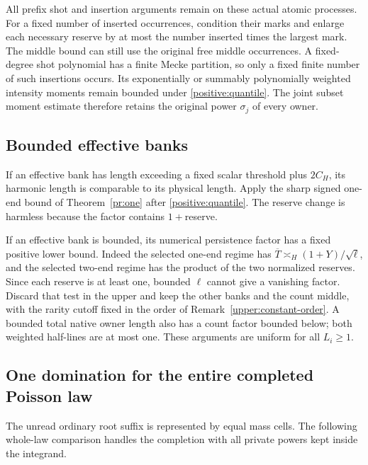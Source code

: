 All prefix shot and insertion arguments remain on these actual atomic
processes. For a fixed number of inserted occurrences, condition their
marks and enlarge each necessary reserve by at most the number inserted
times the largest mark. The middle bound can still use the original
free middle occurrences. A fixed-degree shot polynomial has a finite
Mecke partition, so only a fixed finite number of such insertions occurs.
Its exponentially or summably polynomially weighted intensity moments
remain bounded under \eqref{positive:quantile}. The joint subset moment
estimate therefore retains the original power $\sigma_j$ of every owner.

\subsection{Bounded effective banks}
If an effective bank has length exceeding a fixed scalar threshold plus
$2C_H$, its harmonic length is comparable to its physical length. Apply
the sharp signed one-end bound of Theorem~\ref{pr:one} after
\eqref{positive:quantile}. The reserve change is harmless because the
factor contains $1+$reserve.

If an effective bank is bounded, its numerical persistence factor has
a fixed positive lower bound. Indeed the selected one-end regime has
$\overline T\asymp_H(1+Y)/\sqrt\ell$, and the selected two-end regime has
the product of the two normalized reserves. Since each reserve is at
least one, bounded $\ell$ cannot give a vanishing factor. Discard that
test in the upper and keep the other banks and the count middle, with
the rarity cutoff fixed in the order of Remark~\ref{upper:constant-order}.
A bounded total native owner length also
has a count factor bounded below; both weighted half-lines are at most
one. These arguments are uniform for all $L_i\geq1$.

\subsection{One domination for the entire completed Poisson law}
The unread ordinary root suffix is represented by equal mass cells.
The following whole-law comparison handles the completion with all
private powers kept inside the integrand.

